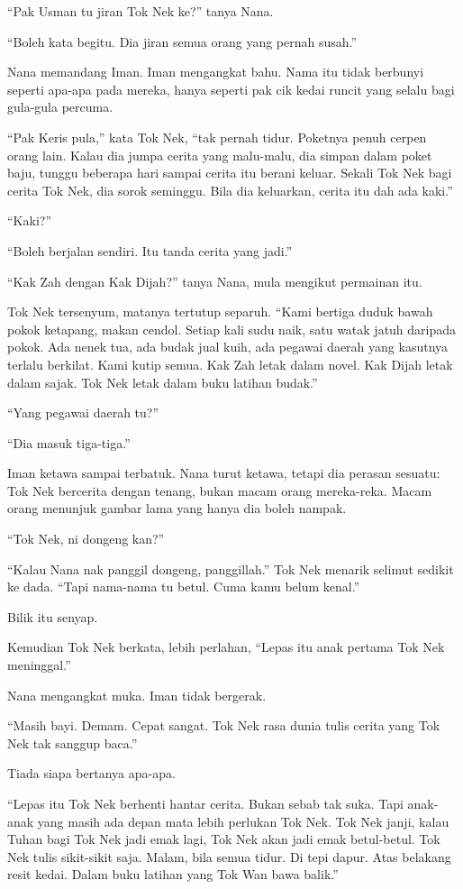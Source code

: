 \documentclass[
  11pt,
  a5paper,
  openany,
  oneside]{book}
\begin{document}
``Pak Usman tu jiran Tok Nek ke?'' tanya Nana.

``Boleh kata begitu. Dia jiran semua orang yang pernah susah.''

Nana memandang Iman. Iman mengangkat bahu. Nama itu tidak berbunyi
seperti apa-apa pada mereka, hanya seperti pak cik kedai runcit yang
selalu bagi gula-gula percuma.

``Pak Keris pula,'' kata Tok Nek, ``tak pernah tidur. Poketnya penuh
cerpen orang lain. Kalau dia jumpa cerita yang malu-malu, dia simpan
dalam poket baju, tunggu beberapa hari sampai cerita itu berani keluar.
Sekali Tok Nek bagi cerita Tok Nek, dia sorok seminggu. Bila dia
keluarkan, cerita itu dah ada kaki.''

``Kaki?''

``Boleh berjalan sendiri. Itu tanda cerita yang jadi.''

``Kak Zah dengan Kak Dijah?'' tanya Nana, mula mengikut permainan itu.

Tok Nek tersenyum, matanya tertutup separuh. ``Kami bertiga duduk bawah
pokok ketapang, makan cendol. Setiap kali sudu naik, satu watak jatuh
daripada pokok. Ada nenek tua, ada budak jual kuih, ada pegawai daerah
yang kasutnya terlalu berkilat. Kami kutip semua. Kak Zah letak dalam
novel. Kak Dijah letak dalam sajak. Tok Nek letak dalam buku latihan
budak.''

``Yang pegawai daerah tu?''

``Dia masuk tiga-tiga.''

Iman ketawa sampai terbatuk. Nana turut ketawa, tetapi dia perasan
sesuatu: Tok Nek bercerita dengan tenang, bukan macam orang mereka-reka.
Macam orang menunjuk gambar lama yang hanya dia boleh nampak.

``Tok Nek, ni dongeng kan?''

``Kalau Nana nak panggil dongeng, panggillah.'' Tok Nek menarik selimut
sedikit ke dada. ``Tapi nama-nama tu betul. Cuma kamu belum kenal.''

Bilik itu senyap.

Kemudian Tok Nek berkata, lebih perlahan, ``Lepas itu anak pertama Tok
Nek meninggal.''

Nana mengangkat muka. Iman tidak bergerak.

``Masih bayi. Demam. Cepat sangat. Tok Nek rasa dunia tulis cerita yang
Tok Nek tak sanggup baca.''

Tiada siapa bertanya apa-apa.

``Lepas itu Tok Nek berhenti hantar cerita. Bukan sebab tak suka. Tapi
anak-anak yang masih ada depan mata lebih perlukan Tok Nek. Tok Nek
janji, kalau Tuhan bagi Tok Nek jadi emak lagi, Tok Nek akan jadi emak
betul-betul. Tok Nek tulis sikit-sikit saja. Malam, bila semua tidur. Di
tepi dapur. Atas belakang resit kedai. Dalam buku latihan yang Tok Wan
bawa balik.''
\end{document}
